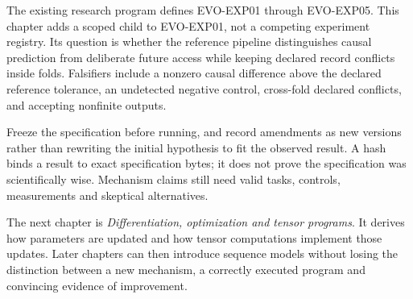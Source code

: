 
The existing research program defines EVO-EXP01 through EVO-EXP05. This chapter adds a scoped child to EVO-EXP01, not a competing experiment registry. Its question is whether the reference pipeline distinguishes causal prediction from deliberate future access while keeping declared record conflicts inside folds. Falsifiers include a nonzero causal difference above the declared reference tolerance, an undetected negative control, cross-fold declared conflicts, and accepting nonfinite outputs.

Freeze the specification before running, and record amendments as new versions rather than rewriting the initial hypothesis to fit the observed result. A hash binds a result to exact specification bytes; it does not prove the specification was scientifically wise. Mechanism claims still need valid tasks, controls, measurements and skeptical alternatives.

The next chapter is \emph{Differentiation, optimization and tensor programs}. It derives how parameters are updated and how tensor computations implement those updates. Later chapters can then introduce sequence models without losing the distinction between a new mechanism, a correctly executed program and convincing evidence of improvement.

